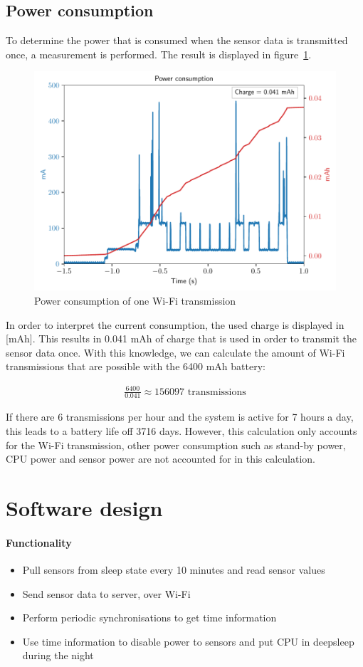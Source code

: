 \documentclass[11pt,a4paper]{article}
\begin{document}
\subsection{Power consumption}
To determine the power that is consumed when the sensor data is transmitted once, a measurement is performed. The result is displayed in figure~\ref{fig:wifi_pwr}.
\begin{figure}[H]
	\centering
	\includegraphics[width=1.0\linewidth]{wifi_pwr.pdf}
	\caption{Power consumption of one Wi-Fi transmission}
	\label{fig:wifi_pwr}
\end{figure}
In order to interpret the current consumption, the used charge is displayed in [mAh]. This results in 0.041 mAh of charge that is used in order to transmit the sensor data once. With this knowledge, we can calculate the amount of Wi-Fi transmissions that are possible with the 6400 mAh battery:

\begin{gather*}
	\frac{6400}{0.041} \approx 156097 \text{ transmissions}
\end{gather*}

If there are 6 transmissions per hour and the system is active for 7 hours a day, this leads to a battery life off 3716 days.  However, this calculation only accounts for the Wi-Fi transmission, other power consumption such as stand-by power, CPU power and sensor power are not accounted for in this calculation. 

\section{Software design}
\paragraph{Functionality}
\begin{itemize}
	\item Pull sensors from sleep state every 10 minutes and read sensor values
	\item Send sensor data to server, over Wi-Fi
	\item Perform periodic synchronisations to get time information
	\item Use time information to disable power to sensors and put CPU in deepsleep during the night
\end{itemize}
\end{document}
